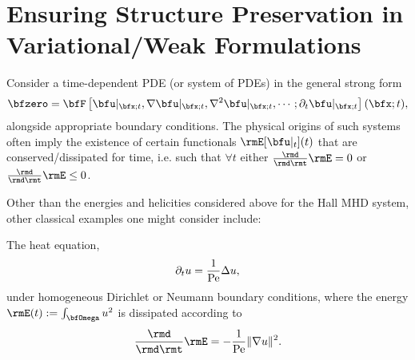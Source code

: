 \section{Ensuring Structure Preservation in Variational/Weak Formulations}

    Consider a time-dependent PDE (or system of PDEs) in the general strong form
    \begin{equation}\label{eqn:general time-dependent PDE}
        \bfzero  =  \bfF\left[\bfu|_{\bfx; t}, \nabla\bfu|_{\bfx; t}, \nabla^{2}\bfu|_{\bfx; t}, \cdots; \partial_{t}\bfu|_{\bfx; t}\right](\bfx; t),
    \end{equation}
    alongside appropriate boundary conditions. The physical origins of such systems often imply the existence of certain functionals $\rmE[\bfu|_{t}](t)$ that are conserved/dissipated for time, i.e. such that $\forall  t$ either $\frac{\rmd}{\rmd\rmt}\rmE  =  0$ or $\frac{\rmd}{\rmd\rmt}\rmE  \leq  0$.
    
    \line
    
    Other than the energies and helicities considered above for the Hall MHD system, other classical examples one might consider include:
    \begin{example}
        The heat equation,
        \begin{equation}\label{eqn:heat equation}
            \partial_{t}u  =  \frac{1}{\mathrm{Pe}}\Delta u,
        \end{equation}
        under homogeneous Dirichlet or Neumann boundary conditions, where the energy $\rmE(t)  :=  \int_{\bfOmega}u^{2}$ is dissipated according to
        \begin{equation}\label{eqn:heat equation dissipation}
            \frac{\rmd}{\rmd\rmt}\rmE  =  - \frac{1}{\rmPe}\|\nabla u\|^{2}.
        \end{equation}
    \end{example}
    

